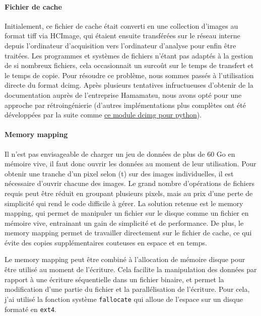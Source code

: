 \paragraph{Fichier de cache}
Initialement, ce fichier de cache était converti en une collection d'images au format tiff via HCImage, qui étaient ensuite transférées sur le réseau interne depuis l'ordinateur d'acquisition vers l'ordinateur d'analyse pour enfin être traitées. Les programmes et systèmes de fichiers n'étant pas adaptés à la gestion de si nombreux fichiers, cela occasionnait un surcoût sur le temps de transfert et le temps de copie. Pour résoudre ce problème, nous sommes passés à l'utilisation directe du format dcimg. Après plusieurs tentatives infructueuses d'obtenir de la documentation auprès de l'entreprise Hamamatsu, nous avons opté pour une approche par rétroingénierie (d'autres implémentations plus complètes ont été développées par la suite comme \href{https://github.com/lens-biophotonics/dcimg}{ce module dcimg pour python}).

\paragraph{Memory mapping}
Il n'est pas envisageable de charger un jeu de données de plus de 60 Go en mémoire vive, il faut donc ouvrir les données au moment de leur utilisation. Pour obtenir une tranche d'un pixel selon (t) sur des images individuelles, il est nécessaire d'ouvrir chacune des images. Le grand nombre d'opérations de fichiers requis peut être réduit en groupant plusieurs pixels, mais au prix d'une perte de simplicité qui rend le code difficile à gérer. La solution retenue est le memory mapping, qui permet de manipuler un fichier sur le disque comme un fichier en mémoire vive, entrainant un gain de simplicité et de performance. De plus, le memory mapping permet de travailler directement sur le fichier de cache, ce qui évite des copies supplémentaires couteuses en espace et en temps.

Le memory mapping peut être combiné à l'allocation de mémoire disque pour être utilisé au moment de l'écriture. Cela facilite la manipulation des données par rapport à une écriture séquentielle dans un fichier binaire, et permet la modification d'une partie du fichier et la parallélisation de l'écriture. Pour cela, j'ai utilisé la fonction système \verb|fallocate| qui alloue de l'espace sur un disque formaté en \verb|ext4|.

